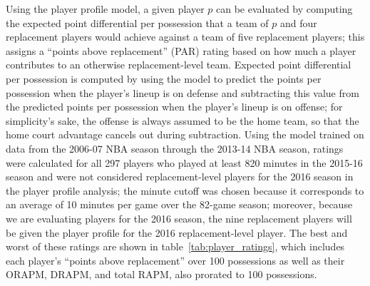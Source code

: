 Using the player profile model, a given player $p$ can be evaluated by computing the
expected point differential per possession that a team of $p$ and four replacement
players would achieve against a team of five replacement players; this assigns a
``points above replacement'' (PAR) rating based on how much a player contributes to
an otherwise replacement-level team. Expected point differential per possession is
computed by using the model to predict the points per possession when the player's
lineup is on defense and subtracting this value from the predicted points per
possession when the player's lineup is on offense; for simplicity's sake, the
offense is always assumed to be the home team, so that the home court advantage
cancels out during subtraction. Using the model trained on data from the 2006-07 NBA
season through the 2013-14 NBA season, ratings were calculated for all 297 players
who played at least 820 minutes in the 2015-16 season and were not considered
replacement-level players for the 2016 season in the player profile analysis; the
minute cutoff was chosen because it corresponds to an average of 10 minutes per game
over the 82-game season; moreover, because we are evaluating players for the
2016 season, the nine replacement players will be given the player profile for the
2016 replacement-level player. The best and worst of these ratings are shown in
table~\ref{tab:player_ratings}, which includes each player's ``points above
replacement'' over 100 possessions as well as their ORAPM, DRAPM, and total RAPM,
also prorated to 100 possessions.

